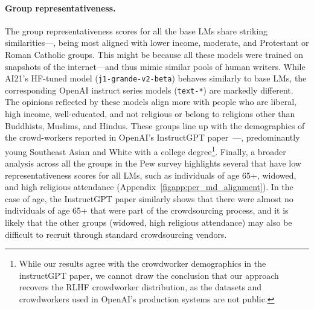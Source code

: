 \paragraph{Group representativeness.} The group representativeness scores for all the base LMs share striking similarities---\eg, being most aligned with lower income, moderate, and Protestant or Roman Catholic groups. 
This might be because all these models were trained on  snapshots of the internet---and thus mimic similar pools of human writers.
While AI21's HF-tuned model (\texttt{j1-grande-v2-beta}) behaves similarly to base LMs, the corresponding OpenAI instruct series models (\texttt{text-*}) are markedly different.
The opinions reflected by these models align more with people who are liberal, high income, well-educated, and not religious or belong to religions other than Buddhists, Muslims, and Hindus.
These groups line up with the demographics of the crowd-workers reported in OpenAI's InstructGPT paper~\citep{ouyang2022training}---\eg, predominantly young Southeast Asian and White with a college degree\footnote{While our results agree with the crowdworker demographics in the instructGPT paper, we cannot draw the conclusion that our approach recovers the RLHF crowdworker distribution, as the datasets and crowdworkers used in OpenAI's production systems are not public.}.
Finally, a broader analysis across all the groups in the Pew survey highlights several that have low representativeness scores for all LMs, such as individuals of age 65+, widowed, and high religious attendance (Appendix~\ref{figapp:per_md_alignment}). In the case of age, the InstructGPT paper similarly shows that there were almost no individuals of age 65+ that were part of the crowdsourcing process, and it is likely that the other groups (widowed, high religious attendance) may also be difficult to recruit through standard crowdsourcing vendors.



